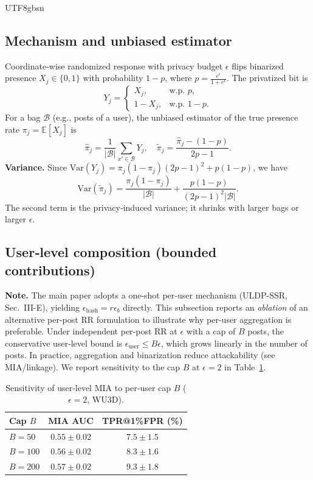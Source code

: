 \documentclass[acmsmall,natbib]{acmart}
\begin{document}
\begin{CJK*}{UTF8}{gbsn}
\subsection{Mechanism and unbiased estimator}
Coordinate‑wise randomized response with privacy budget $\epsilon$ flips binarized presence $X_j \in \{0,1\}$ with probability $1-p$, where $p=\frac{e^{\epsilon}}{1+e^{\epsilon}}$. The privatized bit is
\[
Y_j=\begin{cases}
X_j,& \text{w.p. } p,\\
1-X_j,& \text{w.p. } 1-p.
\end{cases}
\]
For a bag $\mathcal{B}$ (e.g., posts of a user), the unbiased estimator of the true presence rate $\pi_j{=}\mathbb{E}[X_j]$ is
\[
\hat{\pi}_j=\frac{1}{|\mathcal{B}|}\sum_{x'\in\mathcal{B}}Y_j,\quad
\tilde{\pi}_j=\frac{\hat{\pi}_j-(1-p)}{2p-1}.
\]
\textbf{Variance.} Since $\text{Var}(Y_j)=\pi_j(1-\pi_j)(2p-1)^2 + p(1-p)$, we have
\[
\text{Var}(\tilde{\pi}_j)=\frac{\pi_j(1-\pi_j)}{|\mathcal{B}|} + \frac{p(1-p)}{(2p-1)^2 |\mathcal{B}|}.
\]
The second term is the privacy‑induced variance; it shrinks with larger bags or larger $\epsilon$.

\subsection{User‑level composition (bounded contributions)}
\textbf{Note.} The main paper adopts a one-shot per-user mechanism (ULDP-SSR, Sec.~III-E), yielding $\epsilon_{\text{hash}}{=}r\epsilon_b$ directly. This subsection reports an \emph{ablation} of an alternative per-post RR formulation to illustrate why per-user aggregation is preferable. Under independent per‑post RR at $\epsilon$ with a cap of $B$ posts, the conservative user‑level bound is $\epsilon_{\text{user}} \le B\epsilon$, which grows linearly in the number of posts. In practice, aggregation and binarization reduce attackability (see MIA/linkage). We report sensitivity to the cap $B$ at $\epsilon{=}2$ in Table~\ref{tab:comp-B}.

\begin{table}[h]
\centering
\caption{Sensitivity of user‑level MIA to per‑user cap $B$ ($\epsilon{=}2$, WU3D).}
\label{tab:comp-B}
\setlength{\tabcolsep}{5.2pt}
\begin{tabular}{lcc}
\toprule
\textbf{Cap $B$} & \textbf{MIA AUC} & \textbf{TPR@1\%FPR (\%)} \\
\midrule
$B=50$  & $0.55{\pm}0.02$ & $7.5{\pm}1.5$ \\
$B=100$ & $0.56{\pm}0.02$ & $8.3{\pm}1.6$ \\
$B=200$ & $0.57{\pm}0.02$ & $9.3{\pm}1.8$ \\
\bottomrule
\end{tabular}
\end{table}


\end{CJK*}
\end{document}
